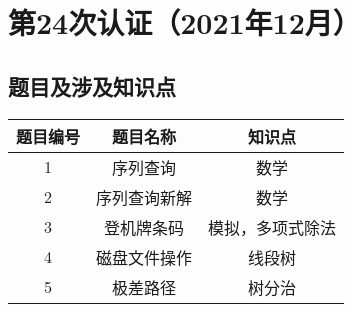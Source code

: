\documentclass[cn,10pt,math=newtx,citestyle=gb7714-2015,bibstyle=gb7714-2015]{elegantbook}
\begin{document}
\chapter{第24次认证（2021年12月）}

\section{题目及涉及知识点}

\begin{table}[htbp]
  \centering
  \begin{tabular}{ccc}
    \toprule
    题目编号 & 题目名称 & 知识点\\
    \midrule
    1 & 序列查询 & 数学\\
    2 & 序列查询新解 & 数学\\
    3 & 登机牌条码 & 模拟，多项式除法\\
    4 & 磁盘文件操作 & 线段树\\
    5 & 极差路径 & 树分治\\
    \bottomrule
  \end{tabular}
\end{table}




\end{document}
